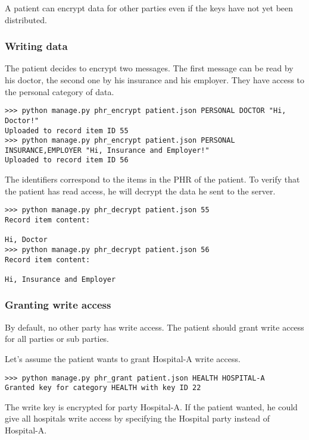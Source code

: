 \documentclass[a4paper]{article}
\begin{document}
			A patient can encrypt data for other parties even if the keys have not yet been distributed.
		
		\subsubsection{Writing data}\label{sec:usecase_2}
			The patient decides to encrypt two messages. The first message can be read by his doctor, the second one by his insurance and his employer. They have access to the personal category of data.
		
			\begin{lstlisting}
>>> python manage.py phr_encrypt patient.json PERSONAL DOCTOR "Hi, Doctor!"
Uploaded to record item ID 55
>>> python manage.py phr_encrypt patient.json PERSONAL INSURANCE,EMPLOYER "Hi, Insurance and Employer!"
Uploaded to record item ID 56
			\end{lstlisting}
		
			The identifiers correspond to the items in the PHR of the patient. To verify that the patient has read access, he will decrypt the data he sent to the server.
		
			\begin{lstlisting}
>>> python manage.py phr_decrypt patient.json 55
Record item content:

Hi, Doctor
>>> python manage.py phr_decrypt patient.json 56
Record item content:

Hi, Insurance and Employer
			\end{lstlisting}
		
		\subsubsection{Granting write access}\label{sec:usecase_3}
			By default, no other party has write access. The patient should grant write access for all parties or sub parties.
		
			Let's assume the patient wants to grant Hospital-A write access.
			
			\begin{lstlisting}		
>>> python manage.py phr_grant patient.json HEALTH HOSPITAL-A
Granted key for category HEALTH with key ID 22
			\end{lstlisting}
			
			The write key is encrypted for party Hospital-A. If the patient wanted, he could give all hospitals write access by specifying the Hospital party instead of Hospital-A.
		
\end{document}
